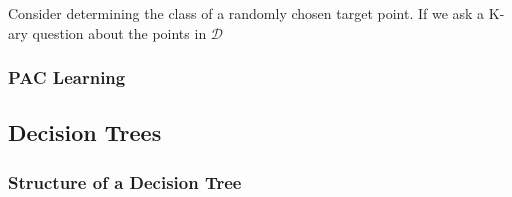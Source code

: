Consider determining the class of a randomly chosen target point. If we ask a K-ary question about the points in $\mathcal{D}$

\subsubsection{PAC Learning}

\subsection{Decision Trees}

\subsubsection{Structure of a Decision Tree}


